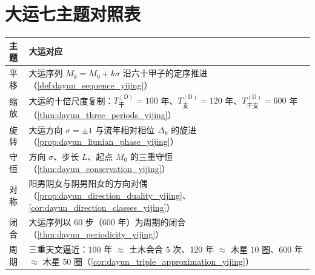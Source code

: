 \section*{大运七主题对照表}

\begin{center}
\renewcommand{\arraystretch}{1.3}
\begin{tabular}{>{\centering\arraybackslash}p{2.2cm}>{\centering\arraybackslash}p{10.5cm}}
\toprule
主题 & 大运对应 \\
\midrule
平移 & 大运序列 $M_k=M_0+k\sigma$ 沿六十甲子的定序推进（\cref{def:dayun_sequence_yijing}） \\
缩放 & 大运的十倍尺度复制：$T_{\text{干}}^{\mathrm{(D)}}=100$ 年、$T_{\text{支}}^{\mathrm{(D)}}=120$ 年、$T_{\text{干支}}^{\mathrm{(D)}}=600$ 年（\cref{thm:dayun_three_periods_yijing}） \\
旋转 & 大运方向 $\sigma=\pm 1$ 与流年相对相位 $\Delta_k$ 的旋进（\cref{prop:dayun_liunian_phase_yijing}） \\
守恒 & 方向 $\sigma$、步长 $L$、起点 $M_0$ 的三重守恒（\cref{thm:dayun_conservation_yijing}） \\
对称 & 阳男阴女与阴男阳女的方向对偶（\cref{prop:dayun_direction_duality_yijing}、\cref{cor:dayun_direction_classes_yijing}） \\
闭合 & 大运序列以 $60$ 步（$600$ 年）为周期的闭合（\cref{thm:dayun_periodicity_yijing}） \\
周期 & 三重天文逼近：$100$ 年 $\approx$ 土木会合 $5$ 次、$120$ 年 $\approx$ 木星 $10$ 圈、$600$ 年 $\approx$ 木星 $50$ 圈（\cref{cor:dayun_triple_approximation_yijing}） \\
\bottomrule
\end{tabular}
\end{center}

